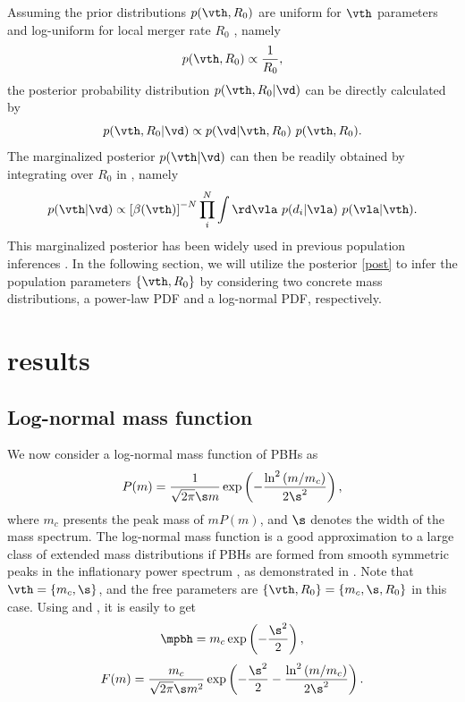 \documentclass[
reprint,           %
superscriptaddress,%
amsmath,           %
amssymb,           %
aps,               %
prd,               %
notitlepage,       %
longbibliography,  %
floatfix,          %
showkeys,          %
]{revtex4-1}
\def\({\left(}
\def\){\right)}
\def\[{\left[}
\def\]{\right]}
\def\e{\begin{equation}}
\def\q{\end{equation}}
\begin{document}
Assuming the prior distributions $p(\vth, R_0)$ are uniform for $\vth$ parameters
and log-uniform for local merger rate $R_0$
\cite{Abbott:2016nhf,Abbott:2017vtc}, namely
\e 
p(\vth, R_0) \propto \frac{1}{R_0},
\q 
the posterior probability distribution $p(\vth, R_0|\vd)$ 
can be directly calculated by
\e\label{post} 
p(\vth, R_0|\vd) \propto p(\vd |\vth, R_0)\ p(\vth, R_0).
\q
The marginalized posterior $p(\vth|\vd)$ can then be readily obtained by
integrating over $R_0$ in , namely
\e\label{post_vth} 
p(\vth|\vd) \propto \[\beta(\vth)\]^{-N} 
\prod_i^N \int \rd\vla\ p(d_i|\vla)\ p(\vla|\vth).
\q 
This marginalized posterior has been widely used in previous 
population inferences 
\cite{Abbott:2016nhf,Abbott:2017vtc,TheLIGOScientific:2016pea,
    Abbott:2016drs,Fishbach:2017zga,Chen:2018rzo}.
In the following section, we will utilize the posterior \eqref{post} to infer
the population parameters $\{\vth, R_0\}$ by considering two concrete mass
distributions, a power-law PDF and a log-normal PDF, respectively.

\section{\label{result}results}
\subsection{Log-normal mass function}
We now consider a log-normal mass function of PBHs as \cite{Dolgov:1992pu}
\e\label{log}
P(m) = \frac{1}{\sqrt{2\pi} \s m} \exp \(-\frac{\ln^2\(m/m_c\)}{2\s^2}\),
\q
where $m_c$ presents the peak mass of $m P(m)$, and $\s$ denotes the width of 
the mass spectrum.
The log-normal mass function is a good approximation to a large class of extended mass distributions if PBHs are formed from smooth symmetric peaks in the inflationary power spectrum \cite{Carr:2017jsz}, as demonstrated in \cite{Green:2016xgy,Kannike:2017bxn}.
Note that $\vth=\{m_c, \s\}$, and the free parameters are 
$\{\vth, R_0\} = \{m_c, \s, R_0\}$ in this case. 
Using  and , it is easily to get
\e
\mpbh = m_c \exp \(-\frac{\s^2}{2}\),
\q
\e 
F(m) = \frac{m_c}{\sqrt{2\pi} \s m^2} \exp \(-\frac{\s^2}{2}-\frac{\ln^2\(m/m_c\)}{2\s^2}\).
\q
\end{document}
